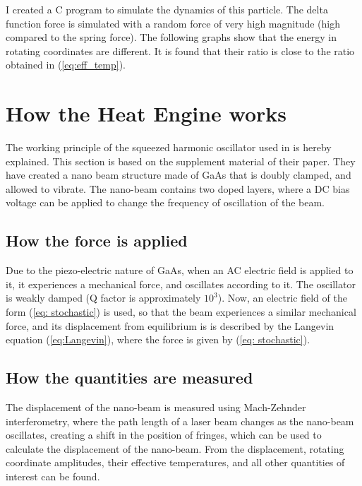 \documentclass[12pt, twoside]{article}
\begin{document}
I created a C program \cite{link_to_c_code} to simulate the dynamics of this particle. The delta function force is simulated with a random force of very high magnitude (high compared to the spring force).
The following graphs show that the energy in rotating coordinates are different. It is found that their ratio is close to the ratio obtained in (\ref{eq:eff_temp}).

\section{How the Heat Engine works}
The working principle of the squeezed harmonic oscillator used in \cite{klaers} is hereby explained. This section is based on the supplement material \cite{klaers_supplement} of their paper. They have created a nano beam structure made of GaAs that is doubly clamped, and allowed to vibrate. The nano-beam contains two doped layers, where a DC bias voltage can be applied to change the frequency of oscillation of the beam. 
\subsection{How the force is applied}
Due to the piezo-electric nature of GaAs, when an AC electric field is applied to it, it experiences a mechanical force, and oscillates according to it. The oscillator is weakly damped (Q factor is approximately $10^3$). Now, an electric field of the form (\ref{eq: stochastic}) is used, so that the beam experiences a similar mechanical force, and its displacement from equilibrium is is described by the Langevin equation (\ref{eq:Langevin}), where the force is given by (\ref{eq: stochastic}).
\subsection{How the quantities are measured}
The displacement of the nano-beam is measured using Mach-Zehnder interferometry, where the path length of a laser beam changes as the nano-beam oscillates, creating a shift in the position of fringes, which can be used to calculate the displacement of the nano-beam. From the displacement, rotating coordinate amplitudes, their effective temperatures, and all other quantities of interest can be found.
\end{document}
